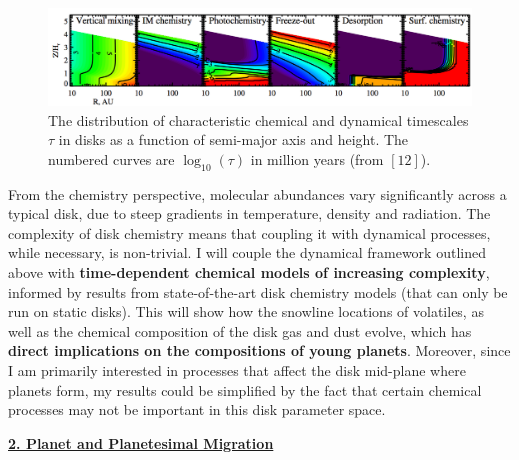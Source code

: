\documentclass[12pt, letterpaper]{article}
\begin{document}
\begin{figure}[h!]
\centering
\includegraphics[width=\textwidth]{chemical_timescales}
\vspace{-0.3in}
\caption{The distribution of characteristic chemical and dynamical timescales $\tau$ in disks as a function of semi-major axis and height. The numbered curves are $\log_{10} (\tau)$ in million years (from $[12]$).}
\label{fig:chemical}
\end{figure}

From the chemistry perspective, molecular abundances vary significantly across a typical disk, due to steep gradients in temperature, density and radiation. 
The complexity of disk chemistry means that coupling it with dynamical processes, while necessary, is non-trivial.  I will couple the dynamical framework outlined above with \textbf{time-dependent chemical models of increasing complexity}, informed by results from state-of-the-art disk chemistry models (that can only be run on static disks). This will show how the snowline locations of volatiles, as well as the chemical composition of the disk gas and dust evolve, which has \textbf{direct implications on the compositions of young planets}. Moreover, since I am primarily interested in processes that affect the disk mid-plane where planets form, my results could be simplified by the fact that certain chemical processes may not be important in this disk parameter space.



\vspace{0.2in}
\underline{\textbf{2. Planet and Planetesimal Migration}}
\end{document}
